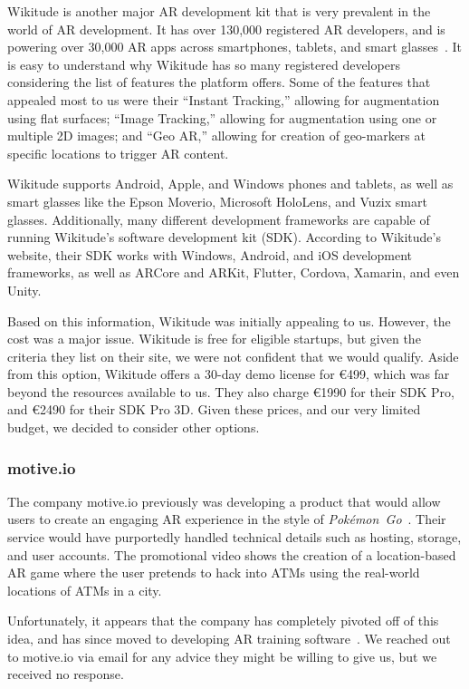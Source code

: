 \documentclass[a4paper, 10pt, american, titlepage]{article}
\begin{document}
Wikitude is another major AR development kit that is very prevalent in the
world of AR development. It has over 130,000 registered AR developers, and is
powering over 30,000 AR apps across smartphones, tablets, and smart
glasses~\autocite{wikitude2018}. It is easy to understand why Wikitude has so
many registered developers considering the list of features the platform
offers. Some of the features that appealed most to us were their ``Instant
Tracking,'' allowing for augmentation using flat surfaces; ``Image Tracking,''
allowing for augmentation using one or multiple 2D images; and ``Geo AR,''
allowing for creation of geo-markers at specific locations to trigger AR
content.

Wikitude supports Android, Apple, and Windows phones and tablets, as well as
smart glasses like the Epson Moverio, Microsoft HoloLens, and Vuzix smart
glasses. Additionally, many different development frameworks are capable of
running Wikitude's software development kit (SDK). According to Wikitude's
website, their SDK works with Windows, Android, and iOS development frameworks,
as well as ARCore and ARKit, Flutter, Cordova, Xamarin, and even Unity.

Based on this information, Wikitude was initially appealing to us. However, the
cost was a major issue. Wikitude is free for eligible startups, but given the
criteria they list on their site, we were not confident that we would qualify.
Aside from this option, Wikitude offers a 30-day demo license for \euro{499},
which was far beyond the resources available to us. They also charge
\euro{1990} for their SDK Pro, and \euro{2490} for their SDK Pro 3D. Given
these prices, and our very limited budget, we decided to consider other
options.

\subsubsection{motive.io}
\label{sec:motive.io}

The company motive.io previously was developing a product that would allow
users to create an engaging AR experience in the style of
\textit{Pokémon~Go}~\autocite{odom2017}. Their service would have purportedly
handled technical details such as hosting, storage, and user accounts. The
promotional video shows the creation of a location-based AR game where the user
pretends to hack into ATMs using the real-world locations of ATMs in a city.

Unfortunately, it appears that the company has completely pivoted off of this
idea, and has since moved to developing AR training
software~\autocite{motiveio}. We reached out to motive.io via email for any
advice they might be willing to give us, but we received no response.
\end{document}
